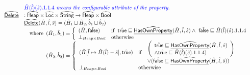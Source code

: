 \[
\begin{array}{ll}

& {\color{blue} \hat{H}(\hat{l})(\hat{s}).1.1.4\textit{ means the configurable attribute of the property.}} \\
\widehat{\underline{\sf Delete}} & : \widehat{\mbox{\textsf{Heap}}} \times \widehat{\mbox{\textsf{Loc}}} \times \widehat{\mbox{\textsf{String}}} \rightarrow \widehat{\mbox{\textsf{Heap}}}
\times \widehat{\mbox{\textsf{Bool}}}\\
& \widehat{\underline{\sf Delete}}(\hat{H},\hat{l},\hat{s})
  = (\hat{H}_1\sqcup\hat{H}_2,\hat{b}_1\sqcup\hat{b}_2)\\
&  \quad{\rm where}\begin{array}[t]{l}
    (\hat{H}_1,\hat{b}_1) = \left\{
      \begin{array}{ll}
        (\hat{H},\hat{\mbox{\textsf{false}}})
        & {\rm if}\begin{array}[t]{l}\hat{\mbox{\textsf{true}}}\sqsubseteq\widehat{\underline{\sf HasOwnProperty}}(\hat{H},\hat{l},\hat{s})
          \land\ \hat{\mbox{\textsf{false}}}\sqsubseteq\hat{H}(\hat{l})(\hat{s}).1.1.4\end{array}\\
        \bot_{Heap\times Bool} & {\rm otherwise} \\
      \end{array}
    \right.\\
    (\hat{H}_2,\hat{b}_2) = \left\{
      \begin{array}{ll}
        (\hat{H}[\hat{l}\mapsto \hat{H}(\hat{l}) - \hat{s}],\hat{\mbox{\textsf{true}}})
        & {\rm if}\begin{array}[t]{l}
          \begin{array}{l}
            \left(
              \begin{array}{l}
              \hat{\mbox{\textsf{true}}} \sqsubseteq\widehat{\underline{\sf HasOwnProperty}}(\hat{H},\hat{l},\hat{s})\\
              \land \hat{\mbox{\textsf{true}}}\sqsubseteq\hat{H}(\hat{l})(\hat{s}).1.1.4)
              \end{array}
            \right)\\
            \vee (\hat{\mbox{\textsf{false}}}\sqsubseteq\widehat{\underline{\sf HasOwnProperty}}(\hat{H},\hat{l},\hat{s}))
          \end{array}\end{array}\\
        \bot_{Heap\times Bool} & {\rm otherwise} \\
      \end{array}
    \right.\\
  \end{array}\\
\\


\end{array}\]
